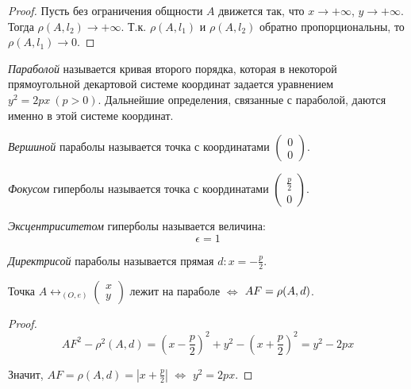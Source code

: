 \begin{proof}
	Пусть без ограничения общности $A$ движется так, что $x \rightarrow +\infty$, $y \rightarrow +\infty$. Тогда $\rho(A, l_2) \rightarrow +\infty$. Т.\:к. $\rho(A, l_1)$ и $\rho(A, l_2)$ обратно пропорциональны, то $\rho(A, l_1) \rightarrow 0$.
\end{proof}

\begin{definition}
	\textit{Параболой} называется кривая второго порядка, которая в некоторой прямоугольной декартовой системе координат задается уравнением $y^2 = 2px~(p > 0)$. Дальнейшие определения, связанные с параболой, даются именно в этой системе координат.
\end{definition}

\begin{definition}
	\textit{Вершиной} параболы называется точка с координатами $\begin{pmatrix}0\\0\end{pmatrix}$.
\end{definition}

\begin{definition}
	\textit{Фокусом} гиперболы называется точка с координатами $\begin{pmatrix}\frac{p}{2}\\0\end{pmatrix}$.
\end{definition}

\begin{definition}
	\textit{Эксцентриситетом} гиперболы называется величина:
	\[\epsilon = 1\]
\end{definition}

\begin{definition}
	\textit{Директрисой} параболы называется прямая $d: x = - \frac{p}{2}$.
\end{definition}

\begin{theorem}
	Точка $A \leftrightarrow_{(O, e)}\begin{pmatrix}x\\y\end{pmatrix}$ лежит на параболе $\Leftrightarrow$ $AF \hm{=} \rho(A, d)$.
\end{theorem}

\begin{proof}
	\[AF^2 - \rho^2(A, d) = \left(x - \frac{p}{2}\right)^2 + y^2 - \left(x + \frac{p}{2}\right)^2 = y^2 - 2px\]
	
	Значит, $AF = \rho(A, d) = |x + \frac{p}{2}|$ $\Leftrightarrow$ $y^2 = 2px$.
\end{proof}

